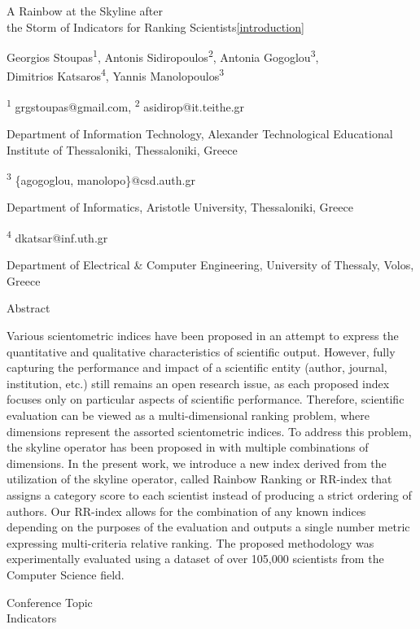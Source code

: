 A Rainbow at the Skyline after\\
the Storm of Indicators for Ranking Scientists\ref{introduction}

Georgios Stoupas\textsuperscript{1}, Antonis
Sidiropoulos\textsuperscript{2}, Antonia Gogoglou\textsuperscript{3},\\
Dimitrios Katsaros\textsuperscript{4}, Yannis
Manolopoulos\textsuperscript{3}

\textsuperscript{1} grgstoupas@gmail.com, \textsuperscript{2}
asidirop@it.teithe.gr

Department of Information Technology, Alexander Technological
Educational Institute of Thessaloniki, Thessaloniki, Greece

\textsuperscript{3} \{agogoglou, manolopo\}@csd.auth.gr

Department of Informatics, Aristotle University, Thessaloniki, Greece

\textsuperscript{4} dkatsar@inf.uth.gr

Department of Electrical \& Computer Engineering, University of
Thessaly, Volos, Greece

Abstract

Various scientometric indices have been proposed in an attempt to
express the quantitative and qualitative characteristics of scientific
output. However, fully capturing the performance and impact of a
scientific entity (author, journal, institution, etc.) still remains an
open research issue, as each proposed index focuses only on particular
aspects of scientific performance. Therefore, scientific evaluation can
be viewed as a multi-dimen­sional ranking problem, where dimensions
represent the assorted scientometric indices. To address this problem,
the skyline operator has been proposed in with multiple combinations of
dimensions. In the present work, we introduce a new index derived from
the utilization of the skyline operator, called Rainbow Ranking or
RR-index that assigns a category score to each scientist instead of
producing a strict ordering of authors. Our RR-index allows for the
combination of any known indices depending on the purposes of the
evaluation and outputs a single number metric expressing multi-criteria
relative ranking. The proposed methodology was experimentally evaluated
using a dataset of over 105,000 scientists from the Computer Science
field.

Conference Topic\\
Indicators